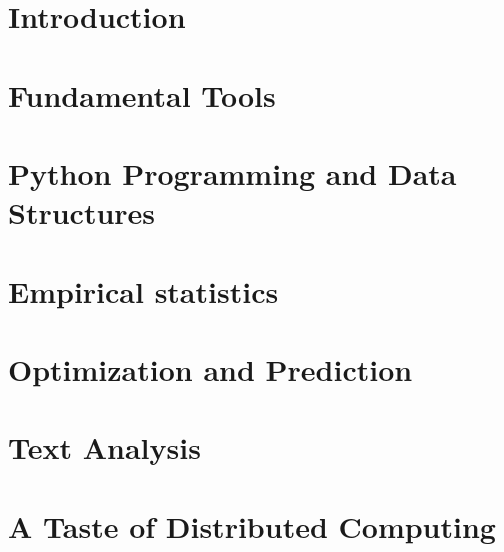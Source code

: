 \documentclass[titlepage]{tufte-book}
\newcommand{\cut}[1]{}
\begin{document}

\tableofcontents %

\mainmatter

\part{Introduction}




\part{Fundamental Tools}





\part{Python Programming and Data Structures}





\part{Empirical statistics}












\part{Optimization and Prediction}




\part{Text Analysis}



\part{A Taste of Distributed Computing}





\cut{

}
\end{document}
